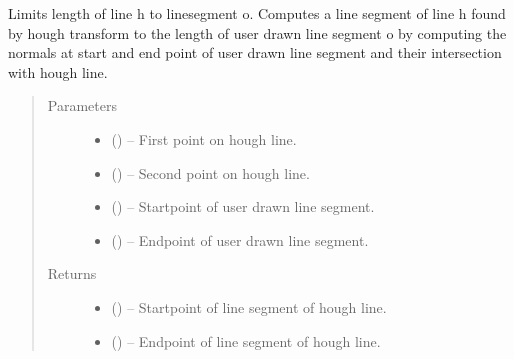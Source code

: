 \documentclass[letterpaper,10pt,english]{sphinxmanual}
\begin{document}
\begin{fulllineitems}
\label{\detokenize{image_lines:image_lines.lim_line_length}}
Limits length of line h to linesegment o.
Computes a line segment of line h found by hough transform to the
length of user drawn line segment o by computing the normals at start
and end point of user drawn line segment and their intersection with
hough line.
\begin{quote}\begin{description}
\item[{Parameters}] \leavevmode\begin{itemize}
\item {} 
 () -- First point on hough line.

\item {} 
 () -- Second point on hough line.

\item {} 
 () -- Startpoint of user drawn line segment.

\item {} 
 () -- Endpoint of user drawn line segment.

\end{itemize}

\item[{Returns}] \leavevmode
\begin{itemize}
\item {} 
 () -- Startpoint of line segment of hough line.

\item {} 
 () -- Endpoint of line segment of hough line.

\end{itemize}


\end{description}\end{quote}

\end{fulllineitems}

\end{document}
